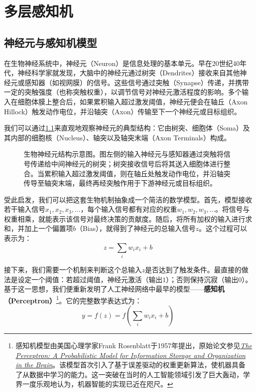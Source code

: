 
\chapter{多层感知机}

\section{神经元与感知机模型}

在生物神经系统中，神经元（Neuron）是信息处理的基本单元。早在20世纪40年代，神经科学家就发现，大脑中的神经元通过树突（Dendrites）接收来自其他神经元或感知器（如视网膜）的信号。这些信号通过突触（Synapse）传递，并携带一定的突触强度（也称突触权重），以调节信号对神经元激活程度的影响。多个输入在细胞体膜上整合后，如果累积输入超过激发阈值，神经元便会在轴丘（Axon Hillock）触发动作电位，并沿轴突（Axon）传输至下一个神经元或目标组织。

我们可以通过\cref{fig:neuron}来直观地观察神经元的典型结构：它由树突、细胞体（Soma）及其内部的细胞核（Nucleus）、轴突以及轴突末端（Axon Terminals）构成。

\begin{figure}[H]
    \caption{生物神经元结构示意图。图左侧的输入神经元与感知器通过突触将信号传递给中间神经元的树突；树突接收信号后将其送入细胞体进行整合。当累积输入超过激发阈值，则在轴丘处触发动作电位，并沿轴突传导至轴突末端，最终再经突触作用于下游神经元或目标组织。}
    \label{fig:neuron}
\end{figure}

受此启发，我们可以把这套生物机制抽象成一个简洁的数学模型。首先，模型接收若干输入信号$x_{1},x_{2},x_{3},\ldots$，每个输入信号都有对应的权重$w_{1},w_{2},w_{3},\ldots$。将信号与权重相乘，就能表示该信号对最终决策的贡献度。随后，将所有加权的输入进行求和，并加上一个偏置项$b$（Bias），就得到了神经元的总输入信号$z$。这个过程可以表示为：
$$
z=\sum_{i}w_{i}x_{i}+b
$$

接下来，我们需要一个机制来判断这个总输入$z$是否达到了触发条件。最直接的做法是设定一个阈值：若超过阈值，神经元激活（输出$1$）；否则保持沉寂（输出$0$）。基于这一思想，我们便重新发明了人工神经网络中最早的模型——\textbf{感知机（Perceptron）}\footnote{感知机模型由美国心理学家Frank Rosenblatt于1957年提出，原始论文参见\href{https://homepages.math.uic.edu/~lreyzin/papers/rosenblatt58.pdf}{\textit{The Perceptron: A Probabilistic Model for Information Storage and Organization in the Brain}}。该模型首次引入了基于误差驱动的权重更新算法，使机器具备了从数据中学习的能力。这一突破在当时的人工智能领域引发了巨大轰动，学界一度乐观地认为，机器智能的实现已近在咫尺。}。它的完整数学表达式为：
$$
y=f(z)=f(\sum_{i}w_{i}x_{i}+b)
$$

